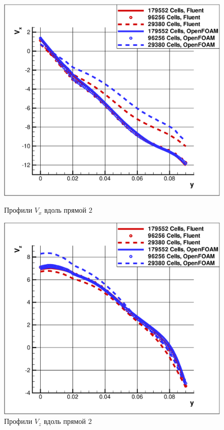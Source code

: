  \begin{figure}[h]
	\vspace{-1em}
	\begin{minipage}{0.475\linewidth}
		\includegraphics[scale=0.33]{cycloneMeshIndependence3}
		\caption{Профили $V_x$ вдоль прямой $2$}
		\label{fig:cycloneMeshIndependence3}
	\end{minipage}
	\hspace{0.5em}
	\begin{minipage}{0.475\linewidth}
		\includegraphics[scale=0.33]{cycloneMeshIndependence4}
		\caption{Профили $V_z$ вдоль прямой $2$}
		\label{fig:cycloneMeshIndependence4}
	\end{minipage}
\end{figure}
